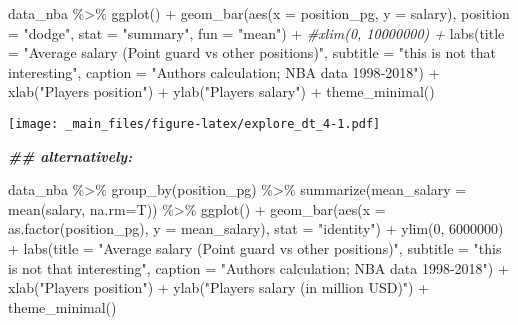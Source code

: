 \documentclass[
]{book}
\newenvironment{Shaded}{\begin{snugshade}}{\end{snugshade}}
\newcommand{\AttributeTok}[1]{\textcolor[rgb]{0.77,0.63,0.00}{#1}}
\newcommand{\AttributeTok}[1]{\textcolor[rgb]{0.13,0.29,0.53}{#1}}
\newcommand{\CommentTok}[1]{\textcolor[rgb]{0.56,0.35,0.01}{\textit{#1}}}
\newcommand{\DecValTok}[1]{\textcolor[rgb]{0.00,0.00,0.81}{#1}}
\newcommand{\DocumentationTok}[1]{\textcolor[rgb]{0.56,0.35,0.01}{\textbf{\textit{#1}}}}
\newcommand{\FunctionTok}[1]{\textcolor[rgb]{0.00,0.00,0.00}{#1}}
\newcommand{\FunctionTok}[1]{\textcolor[rgb]{0.13,0.29,0.53}{\textbf{#1}}}
\newcommand{\NormalTok}[1]{#1}
\newcommand{\SpecialCharTok}[1]{\textcolor[rgb]{0.00,0.00,0.00}{#1}}
\newcommand{\SpecialCharTok}[1]{\textcolor[rgb]{0.81,0.36,0.00}{\textbf{#1}}}
\newcommand{\StringTok}[1]{\textcolor[rgb]{0.31,0.60,0.02}{#1}}
\begin{document}
\begin{Shaded}
\begin{Highlighting}[]
\NormalTok{data\_nba }\SpecialCharTok{\%\textgreater{}\%} 
  \FunctionTok{ggplot}\NormalTok{() }\SpecialCharTok{+}
  \FunctionTok{geom\_bar}\NormalTok{(}\FunctionTok{aes}\NormalTok{(}\AttributeTok{x =}\NormalTok{ position\_pg, }
               \AttributeTok{y =}\NormalTok{ salary),}
           \AttributeTok{position =} \StringTok{"dodge"}\NormalTok{,}
           \AttributeTok{stat =} \StringTok{"summary"}\NormalTok{,}
           \AttributeTok{fun =} \StringTok{"mean"}\NormalTok{) }\SpecialCharTok{+} 
  \CommentTok{\#xlim(0, 10000000) +}
  \FunctionTok{labs}\NormalTok{(}\AttributeTok{title =} \StringTok{"Average salary (Point guard vs other positions)"}\NormalTok{,}
       \AttributeTok{subtitle =} \StringTok{"this is not that interesting"}\NormalTok{,}
       \AttributeTok{caption =} \StringTok{"Authors\textquotesingle{} calculation; NBA data 1998{-}2018"}\NormalTok{) }\SpecialCharTok{+}
  \FunctionTok{xlab}\NormalTok{(}\StringTok{"Player\textquotesingle{}s position"}\NormalTok{) }\SpecialCharTok{+}
  \FunctionTok{ylab}\NormalTok{(}\StringTok{"Player\textquotesingle{}s salary"}\NormalTok{) }\SpecialCharTok{+}
  \FunctionTok{theme\_minimal}\NormalTok{()}
\end{Highlighting}
\end{Shaded}

\texttt{[image: \_main\_files/figure-latex/explore\_dt\_4-1.pdf]}

\begin{Shaded}
\begin{Highlighting}[]
\DocumentationTok{\#\# alternatively:}

\NormalTok{data\_nba }\SpecialCharTok{\%\textgreater{}\%} 
  \FunctionTok{group\_by}\NormalTok{(position\_pg) }\SpecialCharTok{\%\textgreater{}\%}
  \FunctionTok{summarize}\NormalTok{(}\AttributeTok{mean\_salary =} \FunctionTok{mean}\NormalTok{(salary, }\AttributeTok{na.rm=}\NormalTok{T)) }\SpecialCharTok{\%\textgreater{}\%}
  \FunctionTok{ggplot}\NormalTok{() }\SpecialCharTok{+}
  \FunctionTok{geom\_bar}\NormalTok{(}\FunctionTok{aes}\NormalTok{(}\AttributeTok{x =} \FunctionTok{as.factor}\NormalTok{(position\_pg), }
               \AttributeTok{y =}\NormalTok{ mean\_salary),}
           \AttributeTok{stat =} \StringTok{"identity"}\NormalTok{) }\SpecialCharTok{+} 
  \FunctionTok{ylim}\NormalTok{(}\DecValTok{0}\NormalTok{, }\DecValTok{6000000}\NormalTok{) }\SpecialCharTok{+}
  \FunctionTok{labs}\NormalTok{(}\AttributeTok{title =} \StringTok{"Average salary (Point guard vs other positions)"}\NormalTok{,}
       \AttributeTok{subtitle =} \StringTok{"this is not that interesting"}\NormalTok{,}
       \AttributeTok{caption =} \StringTok{"Authors\textquotesingle{} calculation; NBA data 1998{-}2018"}\NormalTok{) }\SpecialCharTok{+}
  \FunctionTok{xlab}\NormalTok{(}\StringTok{"Player\textquotesingle{}s position"}\NormalTok{) }\SpecialCharTok{+}
  \FunctionTok{ylab}\NormalTok{(}\StringTok{"Player\textquotesingle{}s salary (in million USD)"}\NormalTok{) }\SpecialCharTok{+}
  \FunctionTok{theme\_minimal}\NormalTok{()}
\end{Highlighting}
\end{Shaded}
\end{document}
